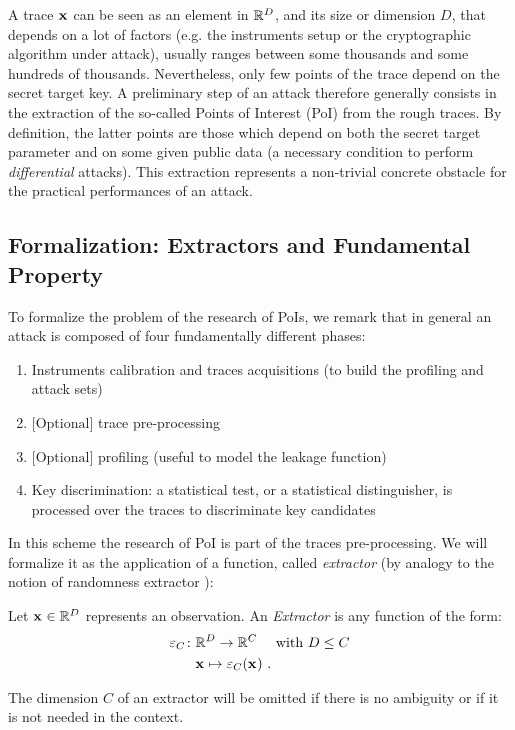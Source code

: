 A trace $\sss[]{}$ can be seen as an element in $\mathbb{R}^\traceLength$, and its size or dimension $D$, that depends on a lot of factors (e.g. the instruments setup or the cryptographic algorithm under attack),  usually ranges between some thousands and some hundreds of thousands. Nevertheless, only few points of the trace depend on the secret target key. A preliminary step of an attack therefore generally consists in the extraction of the so-called {Points of Interest (PoI)} from the  rough traces. By definition, the latter points are those which depend on both the secret target parameter and on some given public data (a necessary condition to perform {\em differential} attacks). This extraction represents a non-trivial concrete obstacle for the practical performances of an attack.

\subsection{Formalization: Extractors and Fundamental Property}


To formalize the problem of the research of PoIs, we remark that in general an attack is composed of four fundamentally different phases:

\begin{enumerate}
\item Instruments calibration and traces acquisitions (to build the profiling and attack sets)
\item $\mbox{[Optional]}$ trace pre-processing
\item $\mbox{[Optional]}$  profiling (useful to model the leakage function)
\item Key discrimination: a  statistical test, or a statistical distinguisher, is processed over the  traces to discriminate key candidates
\end{enumerate}
In this scheme the research of PoI is part of the traces pre-processing. We will formalize it as the application of a function, called {\em extractor} (by analogy to the notion of randomness extractor \cite{DBLP:journals/jcss/NisanZ96}):

\begin{definition}
Let $\sss[]{}\in \mathbb{R}^\traceLength$ represents an observation. An  {\em Extractor}  is any function of the form:
\begin{align*}
\extract_{\newTraceLength}\colon & \mathbb{R}^\traceLength  \rightarrow \mathbb{R}^\newTraceLength \quad \mbox{ with } \traceLength \leq \newTraceLength \\
&\sss[]{}  \mapsto \extractor[\newTraceLength]{\sss[]{}} \mbox{ .}
\end{align*}
\end{definition}
\begin{notation}
The dimension $C$ of an extractor will be omitted if there is no ambiguity or if it is not needed in the context.
\end{notation}

